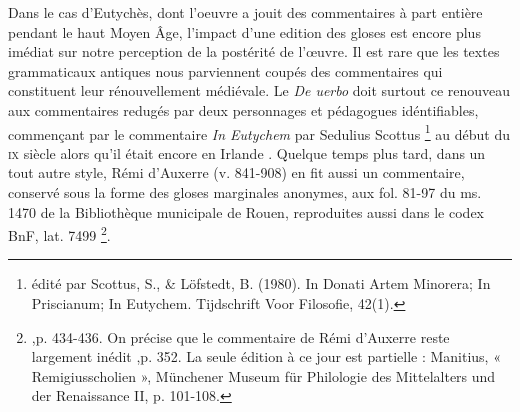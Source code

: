 \documentclass[a4paper, twoside, 12pt]{book}
\begin{document}
Dans le cas d'Eutychès, dont l'oeuvre a jouit des commentaires à part entière pendant le haut Moyen Âge, l'impact d'une edition des gloses est encore plus imédiat sur notre perception de la postérité de l'œuvre. Il est rare que les textes grammaticaux antiques nous parviennent coupés des commentaires qui constituent leur \og{} rénouvellement \fg{} médiévale. Le \textit{De uerbo} doit surtout ce renouveau aux commentaires redugés par deux personnages et pédagogues idéntifiables, commençant par le commentaire \textit{In Eutychem} par Sedulius Scottus \footnote{édité par Scottus, S., \& Löfstedt, B. (1980). In Donati Artem Minorera; In Priscianum; In Eutychem. Tijdschrift Voor Filosofie, 42(1).} au début du \textsc{ix}\ieme{} siècle  alors qu’il était encore en Irlande . Quelque temps plus tard, dans un tout autre style, Rémi d’Auxerre (v. 841-908) en fit aussi un commentaire, conservé sous la forme des gloses marginales anonymes, aux fol. 81-97 du ms. 1470 de la Bibliothèque municipale de Rouen, reproduites aussi dans le codex  BnF, lat. 7499 \footnote{\cite{jeudy1974manuscrits},p. 434-436. On précise que le commentaire de Rémi d'Auxerre reste largement inédit \cite{zetzel2018critics},p. 352. La seule édition à ce jour est partielle : Manitius, « Remigiusscholien »,
Münchener Museum für Philologie des Mittelalters und der Renaissance II, p. 101-108.}.\\
\end{document}
